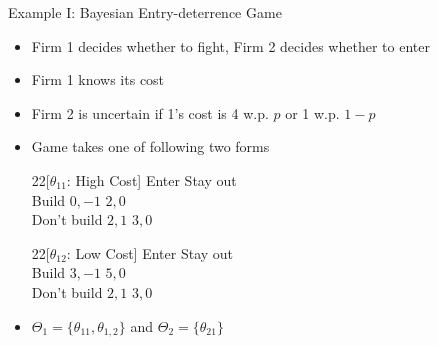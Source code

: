 \documentclass[11pt,aspectratio=169]{beamer}
\begin{document}
  
  \begin{frame}{Example I: Bayesian Entry-deterrence Game}
   \begin{itemize}
    \item Firm 1 decides whether to fight, Firm 2 decides whether to enter
    \item Firm 1 knows its cost
    \item Firm 2 is uncertain if 1's cost is 4 w.p. $p$ or 1 w.p. $1-p$
    \item Game takes one of following two forms
    \vspace{1em}
    \begin{center} \scriptsize
     \begin{game}{2}{2}[$\theta_{11}$: High Cost]
      				\> Enter		\>	Stay out	\\
      Build			\> $0, -1$	\>	$2, 0$	\\
      Don't build	\> $2, 1$	\>	$3, 0$
     \end{game}\hspace{2cm}
     \begin{game}{2}{2}[$\theta_{12}$: Low Cost]
      				\> Enter		\>	Stay out	\\
      Build			\> $3, -1$	\>	$5, 0$	\\
      Don't build	\> $2, 1$	\>	$3, 0$
     \end{game}
    \end{center}
    \vspace{1em}
    \item $\Theta_1 = \{\theta_{11}, \theta_{1,2}\}$ and $\Theta_2 = \{\theta_{21}\}$
   \end{itemize}  
  \end{frame}
  
\end{document}
